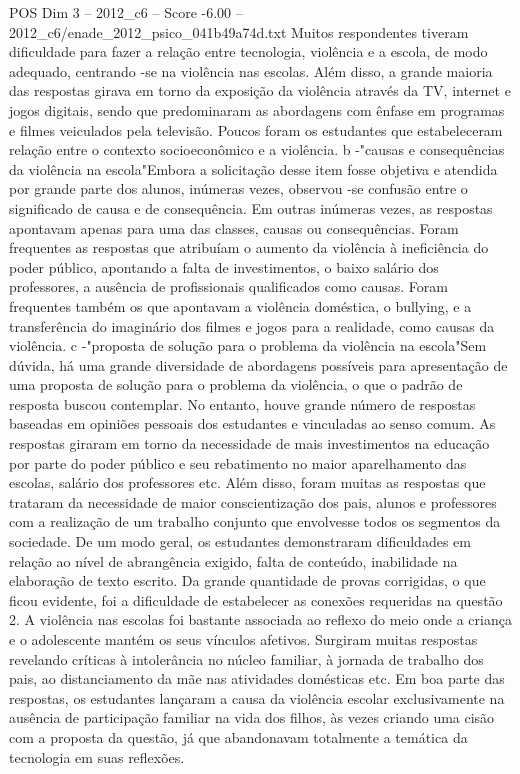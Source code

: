 \begin{textsample}{POS Dim 3 – 2012\_c6 – Score -6.00 – 2012\_c6/enade\_2012\_psico\_041b49a74d.txt}
Muitos respondentes tiveram dificuldade para fazer a relação entre tecnologia, violência e a escola, de modo adequado, centrando -se na violência nas escolas.
Além disso, a grande maioria das respostas girava em torno da exposição da violência através da TV, internet e jogos digitais, sendo que predominaram as abordagens com ênfase em programas e filmes veiculados pela televisão.
Poucos foram os estudantes que estabeleceram relação entre o contexto socioeconômico e a violência. b -"causas e consequências da violência na escola"Embora a solicitação desse item fosse objetiva e atendida por grande parte dos alunos, inúmeras vezes, observou -se confusão entre o significado de causa e de consequência.
Em outras inúmeras vezes, as respostas apontavam apenas para uma das classes, causas ou consequências.
Foram frequentes as respostas que atribuíam o aumento da violência à ineficiência do poder público, apontando a falta de investimentos, o baixo salário dos professores, a ausência de profissionais qualificados como causas.
Foram frequentes também os que apontavam a violência doméstica, o bullying, e a transferência do imaginário dos filmes e jogos para a realidade, como causas da violência. c -"proposta de solução para o problema da violência na escola"Sem dúvida, há uma grande diversidade de abordagens possíveis para apresentação de uma proposta de solução para o problema da violência, o que o padrão de resposta buscou contemplar.
No entanto, houve grande número de respostas baseadas em opiniões pessoais dos estudantes e vinculadas ao senso comum.
As respostas giraram em torno da necessidade de mais investimentos na educação por parte do poder público e seu rebatimento no maior aparelhamento das escolas, salário dos professores etc.
Além disso, foram muitas as respostas que trataram da necessidade de maior conscientização dos pais, alunos e professores com a realização de um trabalho conjunto que envolvesse todos os segmentos da sociedade.
De um modo geral, os estudantes demonstraram dificuldades em relação ao nível de abrangência exigido, falta de conteúdo, inabilidade na elaboração de texto escrito.
Da grande quantidade de provas corrigidas, o que ficou evidente, foi a dificuldade de estabelecer as conexões requeridas na questão 2.
A violência nas escolas foi bastante associada ao reflexo do meio onde a criança e o adolescente mantém os seus vínculos afetivos.
Surgiram muitas respostas revelando críticas à intolerância no núcleo familiar, à jornada de trabalho dos pais, ao distanciamento da mãe nas atividades domésticas etc.
Em boa parte das respostas, os estudantes lançaram a causa da violência escolar exclusivamente na ausência de participação familiar na vida dos filhos, às vezes criando uma cisão com a proposta da questão, já que abandonavam totalmente a temática da tecnologia em suas reflexões.

\end{textsample}

